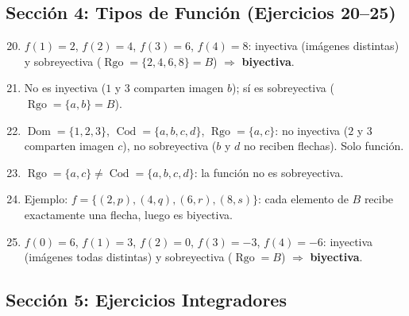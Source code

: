 \documentclass[12pt, letterpaper]{article}
\begin{document}
  \newpage

  \subsection*{Sección 4: Tipos de Función (Ejercicios 20--25)}

  \begin{enumerate}[leftmargin=*, label=\textbf{\arabic*.}]
    \setcounter{enumi}{19}
    \item $f(1)=2$, $f(2)=4$, $f(3)=6$, $f(4)=8$: inyectiva (imágenes distintas) y sobreyectiva ($\operatorname{Rgo} = \{2,4,6,8\} = B$) $\Rightarrow$ \textbf{biyectiva}.

    \item No es inyectiva ($1$ y $3$ comparten imagen $b$); sí es sobreyectiva ($\operatorname{Rgo} = \{a, b\} = B$).

    \item $\operatorname{Dom} = \{1,2,3\}$, $\operatorname{Cod} = \{a,b,c,d\}$, $\operatorname{Rgo} = \{a,c\}$: no inyectiva ($2$ y $3$ comparten imagen $c$), no sobreyectiva ($b$ y $d$ no reciben flechas). Solo función.

    \item $\operatorname{Rgo} = \{a,c\} \neq \operatorname{Cod} = \{a,b,c,d\}$: la función no es sobreyectiva.

    \item Ejemplo: $f = \{(2,p), (4,q), (6,r), (8,s)\}$: cada elemento de $B$ recibe exactamente una flecha, luego es biyectiva.

    \item $f(0)=6$, $f(1)=3$, $f(2)=0$, $f(3)=-3$, $f(4)=-6$: inyectiva (imágenes todas distintas) y sobreyectiva ($\operatorname{Rgo} = B$) $\Rightarrow$ \textbf{biyectiva}.
  \end{enumerate}

  \newpage

  \subsection*{Sección 5: Ejercicios Integradores}
\end{document}
